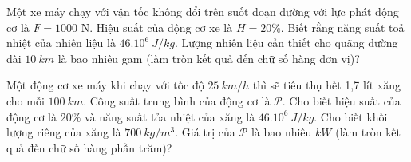 \begin{ex} 
	Một xe máy chạy với vận tốc không đổi trên suốt đoạn đường với lực phát động cơ là $F= 1000$ N. Hiệu suất của động cơ xe là $H=20 \%$. Biết rằng năng suất toả nhiệt của nhiên liệu là $46.10^{6} \ J / kg$. Lượng nhiên liệu cần thiết cho quãng đường dài $10 \ km$ là bao nhiêu gam (làm tròn kết quả  đến chữ số hàng đơn vị)?
\end{ex}


\begin{ex}
	Một động cơ xe máy khi chạy với tốc độ $25 \ km / h$ thì sẽ tiêu thụ hết 1,7 lít xăng cho mỗi $100 \ km$. Công suất trung bình của động cơ là $\mathcal{P}$. Cho biết hiệu suất của động cơ là $20 \%$ và năng suất tỏa nhiệt của xăng là $46 . 10^{6} \ J /kg$. Cho biết khối lượng riêng của xăng là $700 \ kg / m^3$. Giá trị của $\mathcal{P}$ là bao nhiêu $kW$ (làm tròn kết quả  đến chữ số hàng phần trăm)?
	\end{ex}

